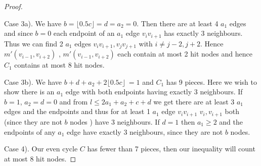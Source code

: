\documentclass{article}
\newcommand{\0}{\mathbb{0}}
\newcommand{\1}{\mathbb{1}}
\begin{document}
\begin{proof}
\begin{figure}[h]
\end{figure}
Case 3a). We have $b = \lfloor 0.5c \rfloor = d = a_2 =0$. Then there are at least 4 $ a_1  $ edges and since $b=0$ each endpoint of an $a_1$ edge $v_i v_{i+1}$ has exactly 3 neighbours. Thus we can find 2 $a_1$ edges $ v_i v_{i+1} , v_j v_{j+1}$ with $i \neq j-2,j+2$.  Hence $m'(v_{i-1},v_{i+2} )$  , $m'(v_{i-1},v_{i+2} )$ each contain at most 2 hit nodes and hence $C_1$ contains at most 8 hit nodes. 

Case 3b).  We have $ b+d + a_2 + 2\lfloor 0.5c \rfloor \ =1 $ and $C_1$ has 9 pieces. Here we wish to show there is an $a_1$ edge with both endpoints having exactly 3 neighbours. If $b=1$, $a_2=d=0$ and from $l \leq 2a_1 + a_2 + c +d $  we get  there are at least 3 $a_1$ edges and the endpoints and thus for at least 1 $a_1$ edge $v_iv_{i+1}$ $v_i, v_{i+1}$  both (since they are not $b$ nodes ) have 3 neighbours.   If $d=1$ then $a_1 \geq 2$ and the endpoints of any $a_1$ edge have exactly 3 neighbours, since they are not $b$ nodes.  

Case 4). Our even cycle $C$ has fewer than 7 pieces, then our inequality will count at most 8 hit nodes.
\end{proof}










\end{document}
